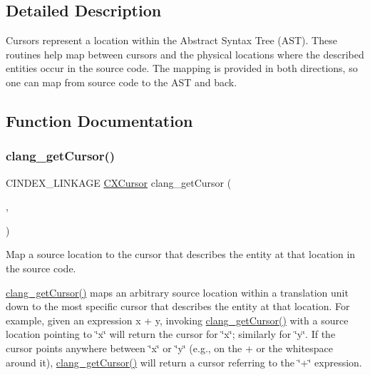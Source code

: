 \subsection{Detailed Description}
Cursors represent a location within the Abstract Syntax Tree (A\+ST). These routines help map between cursors and the physical locations where the described entities occur in the source code. The mapping is provided in both directions, so one can map from source code to the A\+ST and back. 

\subsection{Function Documentation}
\mbox{\label{group__CINDEX__CURSOR__SOURCE_ga30a9972c7e099ab2735fa6c45e247ec8}} 
\subsubsection{\texorpdfstring{clang\+\_\+get\+Cursor()}{clang\_getCursor()}}
{\footnotesize\ttfamily C\+I\+N\+D\+E\+X\+\_\+\+L\+I\+N\+K\+A\+GE \hyperlink{structCXCursor}{C\+X\+Cursor} clang\+\_\+get\+Cursor (\begin{DoxyParamCaption}\item[{\hyperlink{group__CINDEX_gacdb7815736ca709ce9a5e1ec2b7e16ac}{C\+X\+Translation\+Unit}}]{,  }\item[{\hyperlink{structCXSourceLocation}{C\+X\+Source\+Location}}]{ }\end{DoxyParamCaption})}



Map a source location to the cursor that describes the entity at that location in the source code. 

\hyperlink{group__CINDEX__CURSOR__SOURCE_ga30a9972c7e099ab2735fa6c45e247ec8}{clang\+\_\+get\+Cursor()} maps an arbitrary source location within a translation unit down to the most specific cursor that describes the entity at that location. For example, given an expression {\ttfamily x} + y, invoking \hyperlink{group__CINDEX__CURSOR__SOURCE_ga30a9972c7e099ab2735fa6c45e247ec8}{clang\+\_\+get\+Cursor()} with a source location pointing to \char`\"{}x\char`\"{} will return the cursor for \char`\"{}x\char`\"{}; similarly for \char`\"{}y\char`\"{}. If the cursor points anywhere between \char`\"{}x\char`\"{} or \char`\"{}y\char`\"{} (e.\+g., on the + or the whitespace around it), \hyperlink{group__CINDEX__CURSOR__SOURCE_ga30a9972c7e099ab2735fa6c45e247ec8}{clang\+\_\+get\+Cursor()} will return a cursor referring to the \char`\"{}+\char`\"{} expression.

